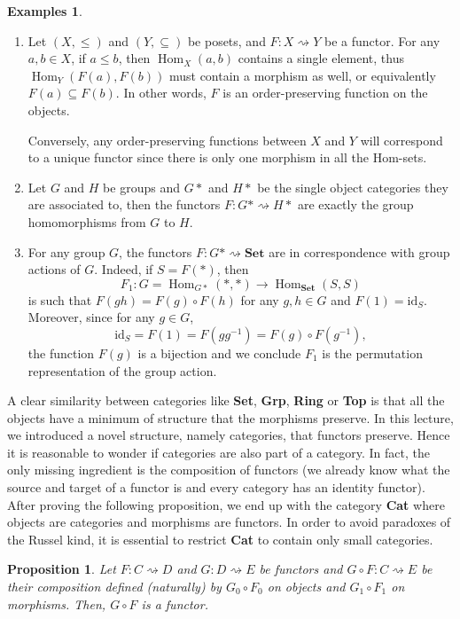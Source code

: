 \documentclass{article}
\newtheorem{prop}[thm]{Proposition}
\theoremstyle{definition}
\newtheorem{exmps}[thm]{Examples}
\theoremstyle{remark}
\DeclareMathOperator{\Hom}{Hom}
\newcommand{\id}{\text{id}}
\begin{document}
\begin{exmps}
\begin{enumerate}
		\item Let $(X, \leq)$ and $(Y, \subseteq)$ be posets, and $F:X\rightsquigarrow Y$ be a functor. For any $a, b \in X$, if $a\leq b$, then $\Hom_X(a,b)$ contains a single element, thus $\Hom_Y(F(a), F(b))$ must contain a morphism as well, or equivalently $F(a) \subseteq F(b)$. In other words, $F$ is an order-preserving function on the objects.
		
		Conversely, any order-preserving functions between $X$ and $Y$ will correspond to a unique functor since there is only one morphism in all the Hom-sets.
				
		\item Let $G$ and $H$ be groups and $G\ast$ and $H\ast$ be the single object categories they are associated to, then the functors $F: G\ast \rightsquigarrow H\ast$ are exactly the group homomorphisms from $G$ to $H$.
		
		\item For any group $G$, the functors $F:G\ast \rightsquigarrow \textbf{Set}$ are in correspondence with group actions of $G$. Indeed, if $S = F(\ast)$, then \[F_1: G = \Hom_{G\ast}(\ast, \ast) \rightarrow \Hom_{\textbf{Set}}(S, S)\]
		is such that $F(gh) = F(g) \circ F(h)$ for any $g,h \in G$ and $F(1) = \id_S$. Moreover, since for any $g \in G$,
		\[\id_S = F(1) = F(gg^{-1}) = F(g) \circ F(g^{-1}),\]
		the function $F(g)$ is a bijection and we conclude $F_1$ is the permutation representation of the group action.
	\end{enumerate}
\end{exmps}
A clear similarity between categories like \textbf{Set}, \textbf{Grp}, \textbf{Ring} or \textbf{Top} is that all the objects have a minimum of structure that the morphisms preserve. In this lecture, we introduced a novel structure, namely categories, that functors preserve. Hence it is reasonable to wonder if categories are also part of a category. In fact, the only missing ingredient is the composition of functors (we already know what the source and target of a functor is and every category has an identity functor). After proving the following proposition, we end up with the category \textbf{Cat} where objects are categories and morphisms are functors. In order to avoid paradoxes of the Russel kind, it is essential to restrict \textbf{Cat} to contain only small categories.
\begin{prop}
	Let $F:C\rightsquigarrow D$ and $G: D\rightsquigarrow E$ be functors and $G \circ F:C \rightsquigarrow E$ be their composition defined (naturally) by $G_0 \circ F_0$ on objects and $G_1 \circ F_1$ on morphisms. Then, $G \circ F$ is a functor.
\end{prop}
\end{document}

